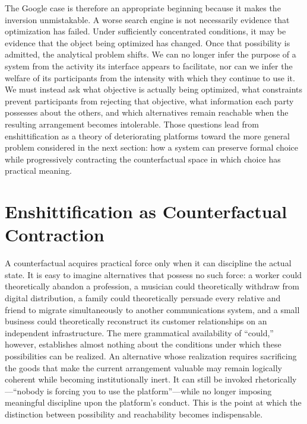 \documentclass[11pt]{article}
\begin{document}
The Google case is therefore an appropriate beginning because it makes the inversion unmistakable. A worse search engine is not necessarily evidence that optimization has failed. Under sufficiently concentrated conditions, it may be evidence that the object being optimized has changed. Once that possibility is admitted, the analytical problem shifts. We can no longer infer the purpose of a system from the activity its interface appears to facilitate, nor can we infer the welfare of its participants from the intensity with which they continue to use it. We must instead ask what objective is actually being optimized, what constraints prevent participants from rejecting that objective, what information each party possesses about the others, and which alternatives remain reachable when the resulting arrangement becomes intolerable. Those questions lead from enshittification as a theory of deteriorating platforms toward the more general problem considered in the next section: how a system can preserve formal choice while progressively contracting the counterfactual space in which choice has practical meaning.

\section{Enshittification as Counterfactual Contraction}

A counterfactual acquires practical force only when it can discipline the actual state. It is easy to imagine alternatives that possess no such force: a worker could theoretically abandon a profession, a musician could theoretically withdraw from digital distribution, a family could theoretically persuade every relative and friend to migrate simultaneously to another communications system, and a small business could theoretically reconstruct its customer relationships on an independent infrastructure. The mere grammatical availability of ``could,'' however, establishes almost nothing about the conditions under which these possibilities can be realized. An alternative whose realization requires sacrificing the goods that make the current arrangement valuable may remain logically coherent while becoming institutionally inert. It can still be invoked rhetorically---``nobody is forcing you to use the platform''---while no longer imposing meaningful discipline upon the platform's conduct. This is the point at which the distinction between possibility and reachability becomes indispensable.
\end{document}
